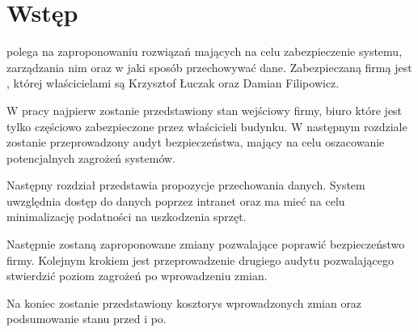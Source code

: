 \newpage\section*{Wstęp}
\TytulPolski \space polega na zaproponowaniu rozwiązań mających na celu zabezpieczenie systemu, zarządzania nim oraz w jaki sposób przechowywać dane. Zabezpieczaną firmą jest \NazwaFirmy, której właścicielami są Krzysztof Łuczak oraz Damian Filipowicz. 

W pracy najpierw zostanie przedstawiony stan wejściowy firmy, biuro które jest tylko częściowo zabezpieczone przez właścicieli budynku. \linebreak W następnym rozdziale zostanie przeprowadzony audyt bezpieczeństwa, \linebreak mający na celu oszacowanie potencjalnych zagrożeń systemów.

 Następny rozdział przedstawia propozycje przechowania danych. System uwzględnia dostęp do danych poprzez intranet oraz ma mieć na celu minimalizację podatności na uszkodzenia sprzęt.
 
Następnie zostaną zaproponowane zmiany pozwalające poprawić bezpieczeństwo firmy. Kolejnym krokiem jest przeprowadzenie drugiego audytu pozwalającego stwierdzić poziom zagrożeń po wprowadzeniu zmian.

Na koniec zostanie przedstawiony kosztorys wprowadzonych zmian oraz podsumowanie stanu przed i po. 